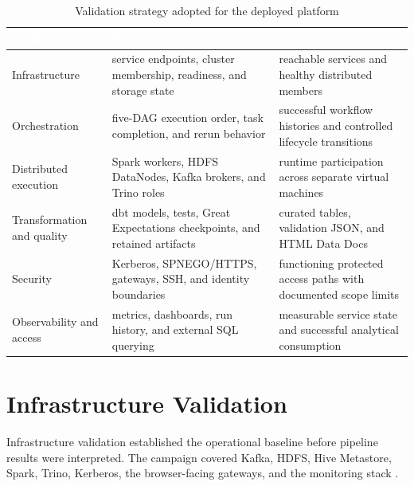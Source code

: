 \begin{table}[!htbp]
    \centering
    \footnotesize
    \renewcommand{\arraystretch}{1.16}
    \begin{tabularx}{\textwidth}{|Y|Y|Y|}
        \hline
        \textcolor{white}{\textbf{Validation axis}} & \textcolor{white}{\textbf{What was checked}} & \textcolor{white}{\textbf{Acceptance evidence}} \\
        \hline
        Infrastructure & service endpoints, cluster membership, readiness, and storage state & reachable services and healthy distributed members \\
        \hline
        Orchestration & five-DAG execution order, task completion, and rerun behavior & successful workflow histories and controlled lifecycle transitions \\
        \hline
        Distributed execution & Spark workers, HDFS DataNodes, Kafka brokers, and Trino roles & runtime participation across separate virtual machines \\
        \hline
        Transformation and quality & dbt models, tests, Great Expectations checkpoints, and retained artifacts & curated tables, validation JSON, and HTML Data Docs \\
        \hline
        Security & Kerberos, SPNEGO/HTTPS, gateways, SSH, and identity boundaries & functioning protected access paths with documented scope limits \\
        \hline
        Observability and access & metrics, dashboards, run history, and external SQL querying & measurable service state and successful analytical consumption \\
        \hline
    \end{tabularx}
    \caption{Validation strategy adopted for the deployed platform}
    \label{tab:chapter8-validation-strategy}
\end{table}
\FloatBarrier

\section{Infrastructure Validation}
Infrastructure validation established the operational baseline before pipeline results were interpreted. The campaign covered Kafka, HDFS, Hive Metastore, Spark, Trino, Kerberos, the browser-facing gateways, and the monitoring stack \cite{apache_kafka_docs,apache_hadoop_docs,apache_hive_docs,apache_spark_docs,trino_docs,mit_kerberos_docs,prometheus_docs,grafana_docs}.

